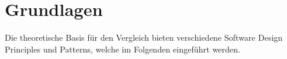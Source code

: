 \section{Grundlagen}
Die theoretische Basis für den Vergleich bieten verschiedene Software Design Principles und Patterns, welche
im Folgenden eingeführt werden.



